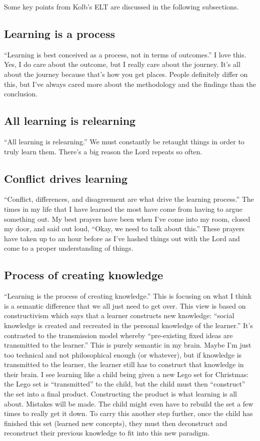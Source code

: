 \documentclass[man,natbib]{apa6}
\begin{document}
Some key points from Kolb's ELT are discussed in the following subsections.
\subsection{Learning is a process}
``Learning is best conceived as a process, not in terms of outcomes.'' I love this. Yes, I do care about the outcome, but I really care about the journey. It's all about the journey because that's how you get places. People definitely differ on this, but I've always cared more about the methodology and the findings than the conclusion.

\subsection{All learning is relearning}
``All learning is relearning.'' We must constantly be retaught things in order to truly learn them. There's a big reason the Lord repeats so often.

\subsection{Conflict drives learning}
``Conflict, differences, and disagreement are what drive the learning process.'' The times in my life that I have learned the most have come from having to argue something out. My best prayers have been when I've come into my room, closed my door, and said out loud, ``Okay, we need to talk about this.'' These prayers have taken up to an hour before as I've hashed things out with the Lord and come to a proper understanding of things.

\subsection{Process of creating knowledge}
``Learning is the process of creating knowledge.'' This is focusing on what I think is a semantic difference that we all just need to get over. This view is based on constructivism which says that a learner constructs new knowledge: ``social knowledge is created and recreated in the personal knowledge of the learner.'' It's contrasted to the transmission model whereby ``pre-existing fixed ideas are transmitted to the learner.'' This is purely semantic in my brain. Maybe I'm just too technical and not philosophical enough (or whatever), but if knowledge is transmitted to the learner, the learner still has to construct that knowledge in their brain. I see learning like a child being given a new Lego set for Christmas: the Lego set is ``transmitted'' to the child, but the child must then ``construct'' the set into a final product. Constructing the product is what learning is all about. Mistakes will be made. The child might even have to rebuild the set a few times to really get it down. To carry this another step further, once the child has finished this set (learned new concepts), they must then deconstruct and reconstruct their previous knowledge to fit into this new paradigm.
\end{document}

